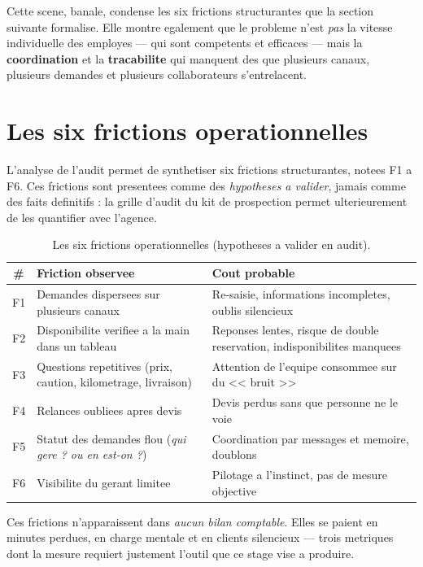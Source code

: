 \documentclass[12pt,a4paper,openany]{report}
\begin{document}
Cette scene, banale, condense les six frictions structurantes que la section suivante formalise. Elle montre egalement que le probleme n'est \emph{pas} la vitesse individuelle des employes --- qui sont competents et efficaces --- mais la \textbf{coordination} et la \textbf{tracabilite} qui manquent des que plusieurs canaux, plusieurs demandes et plusieurs collaborateurs s'entrelacent.

\section{Les six frictions operationnelles}

L'analyse de l'audit permet de synthetiser six frictions structurantes, notees F1 a F6. Ces frictions sont presentees comme des \emph{hypotheses a valider}, jamais comme des faits definitifs : la grille d'audit du kit de prospection permet ulterieurement de les quantifier avec l'agence.

\begin{table}[H]\centering\small
\caption{Les six frictions operationnelles (hypotheses a valider en audit).}
\label{tab:frictions}
\begin{tabularx}{\textwidth}{c l X}\toprule
\rowcolor{boxBlue!30}\textbf{\#} & \textbf{Friction observee} & \textbf{Cout probable}\\\midrule
F1 & Demandes dispersees sur plusieurs canaux            & Re-saisie, informations incompletes, oublis silencieux\\
F2 & Disponibilite verifiee a la main dans un tableau    & Reponses lentes, risque de double reservation, indisponibilites manquees\\
F3 & Questions repetitives (prix, caution, kilometrage, livraison) & Attention de l'equipe consommee sur du << bruit >>\\
F4 & Relances oubliees apres devis                        & Devis perdus sans que personne ne le voie\\
F5 & Statut des demandes flou (\emph{qui gere ? ou en est-on ?}) & Coordination par messages et memoire, doublons\\
F6 & Visibilite du gerant limitee                         & Pilotage a l'instinct, pas de mesure objective\\
\bottomrule
\end{tabularx}
\end{table}

Ces frictions n'apparaissent dans \emph{aucun bilan comptable}. Elles se paient en minutes perdues, en charge mentale et en clients silencieux --- trois metriques dont la mesure requiert justement l'outil que ce stage vise a produire.
\end{document}
